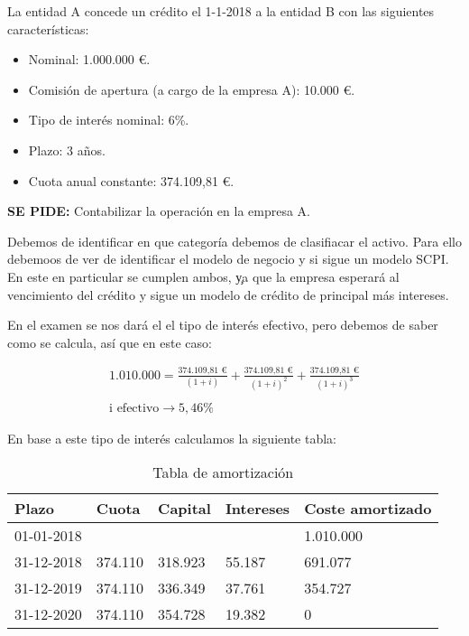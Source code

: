 La entidad A concede un crédito el 1-1-2018 a la entidad B con las siguientes características:

\begin{itemize}
    \item Nominal: 1.000.000 €.
    \item Comisión de apertura (a cargo de la empresa A): 10.000 €.
    \item Tipo de interés nominal: 6\%.
    \item Plazo: 3 años.
    \item Cuota anual constante: 374.109,81 €.
\end{itemize}

\textbf{SE PIDE:} Contabilizar la operación en la empresa A.

Debemos de identificar en  que categoría debemos de clasifiacar el activo. Para ello debemoos de ver de identificar el modelo de negocio y si sigue un modelo SCPI. En este en particular se cumplen ambos, \c{ya que la empresa esperará al vencimiento del crédito y sigue un modelo de crédito de principal más intereses.}

En el examen se nos dará el el tipo de interés efectivo, pero debemos de saber como se calcula, así que en este caso:

\begin{align*}
    \text{1.010.000} = \frac{\text{374.109,81 €}}{(1+i)} + \frac{\text{374.109,81 €}}{(1+i)^2} + \frac{\text{374.109,81 €}}{(1+i)^3} \\\\ 
    \text{i efectivo} \rightarrow 5,46\%
\end{align*}

En base a este tipo de interés calculamos la siguiente tabla:

\begin{table}[h]
    \centering
    \caption{Tabla de amortización}
    \begin{tabularx}{\textwidth}{|X|X|X|X|X|}
    \hline
    \textbf{Plazo} & \textbf{Cuota} & \textbf{Capital} & \textbf{Intereses} & \textbf{Coste amortizado} \\
    \hline
    01-01-2018 & & & & 1.010.000 \\
    \hline
    31-12-2018 & 374.110 & 318.923 & 55.187 & 691.077 \\
    \hline
    31-12-2019 & 374.110 & 336.349 & 37.761 & 354.727 \\
    \hline
    31-12-2020 & 374.110 & 354.728 & 19.382 & 0 \\
    \hline
    \end{tabularx}
    \label{tabla:amortizacion1}
\end{table}

